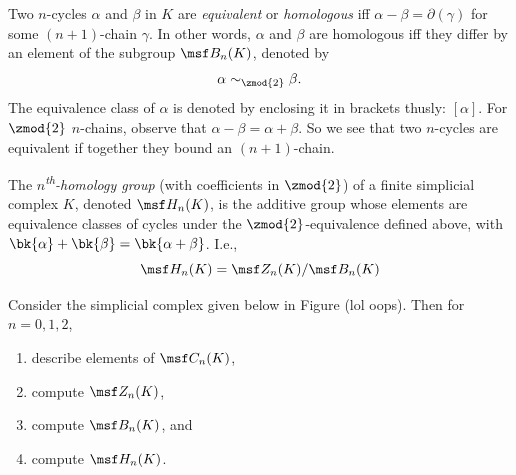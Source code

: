 \begin{definition}
  Two $n$-cycles $\alpha$ and $\beta$ in $K$ are \emph{equivalent} or
  \emph{homologous} iff $\alpha-\beta = \partial(\gamma)$ for some $(n+1)$-chain
  $\gamma$. In other words, $\alpha$ and $\beta$ are homologous iff they differ
  by an element of the subgroup $\msf B_n(K)$, denoted by
  \[
    \alpha \sim_{\zmod{2}} \beta.
  \]
  The equivalence class of $\alpha$ is denoted by enclosing it in brackets
  thusly: $[\alpha]$. For $\zmod{2}$ $n$-chains, observe that $\alpha - \beta =
  \alpha + \beta$. So we see that two $n$-cycles are equivalent if together they
  bound an $(n+1)$-chain.
\end{definition}
\begin{definition}
  The \emph{$n$\textsuperscript{th}-homology group} (with coefficients in
  $\zmod{2}$) of a finite simplicial complex $K$, denoted $\msf H_n(K)$, is the
  additive group whose elements are equivalence classes of cycles under the
  $\zmod{2}$-equivalence defined above, with $\bk{\alpha} + \bk{\beta} =
  \bk{\alpha +\beta}$. I.e.,
  \[
    \msf H_n(K) = \msf Z_n(K)/\msf B_n(K)
  \]
\end{definition}
\begin{problem}[F1]
  Consider the simplicial complex given below in Figure (lol oops). Then for
  $n = 0, 1, 2$,
  \begin{enumerate}
  \item describe elements of $\msf C_n(K)$,
  \item compute $\msf Z_n(K)$,
  \item compute $\msf B_n(K)$, and
  \item compute $\msf H_n(K)$.
  \end{enumerate}
\end{problem}
